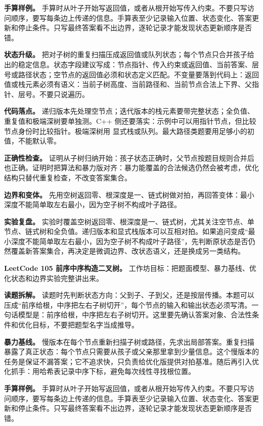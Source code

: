 \textbf{手算样例。} 手算时从叶子开始写返回值，或者从根开始写传入约束。不要只写访问顺序，要写每条边上传递的信息。手算表至少记录输入位置、状态变化、答案更新和停止条件。只写最终答案看不出边界，逐轮记录才能发现状态更新顺序是否错。

\textbf{状态升级。} 把对子树的重复扫描压成返回值或队列状态；每个节点只合并孩子给出的稳定信息。状态字段建议写成：节点指针、传入约束或返回值、当前答案、层号或路径状态；空节点的返回值必须和状态定义匹配。不变量要落到代码上：返回值或栈元素必须有语义：当前子树高度、当前路径和、当前节点合法上下界、父指针、层号。不要只说遍历。

\textbf{代码落点。} 递归版本先处理空节点；迭代版本的栈元素要带完整状态；全负值、重复值和极端深树要单独测。C++ 侧还要落实：示例中可以用指针节点，但比较节点身份时比较指针。极端深树用  显式栈或队列。最大路径类题要用足够小的初值，不能默认零。

\textbf{正确性检查。} 证明从子树归纳开始：孩子状态正确时，父节点按题目规则合并后也正确。证明时把算法和暴力版对齐：暴力能覆盖的合法候选仍然会被考虑，优化结构只替代重复检查，不改变答案集合。

\textbf{边界和变体。} 先用空树返回零、根深度是一、链式树做对拍，再回答变体：最小深度不能简单取左右最小，因为空子树不构成叶子路径。

\textbf{实验复盘。} 实验时覆盖空树返回零、根深度是一、链式树，尤其关注空节点、单节点、链式树和全负值。递归版本和显式栈版本可以互相对拍。如果追问变成“最小深度不能简单取左右最小，因为空子树不构成叶子路径”，先判断原状态是否仍然覆盖新答案集合，再决定是微调边界、改状态语义，还是换成另一类结构。

\noindent\textbf{LeetCode 105 前序中序构造二叉树。} 工作坊目标：把题面模型、暴力基线、优化状态和边界实验完整讲出来。

\textbf{读题拆解。} 读题时先判断状态方向：父到子、子到父，还是按层传播。本题可以压成“前序给根，中序把左右子树切开”，每个节点的输入和输出状态必须写清。一句话模型是：前序给根，中序把左右子树切开。这里要先确认答案对象、合法性条件和优化目标，不要把题型名字当成推导。

\textbf{暴力基线。} 慢版本在每个节点重新扫描子树或路径，先求出局部答案。重复扫描暴露了真正状态：每个节点只需要从孩子或父亲那里拿到少量信息。这个慢版本的任务是保证不漏答案；它不追求快，只负责给优化版提供对拍基准。随后再引入优化抓手：用哈希表记录中序下标，避免每次线性寻找根位置。

\textbf{手算样例。} 手算时从叶子开始写返回值，或者从根开始写传入约束。不要只写访问顺序，要写每条边上传递的信息。手算表至少记录输入位置、状态变化、答案更新和停止条件。只写最终答案看不出边界，逐轮记录才能发现状态更新顺序是否错。


